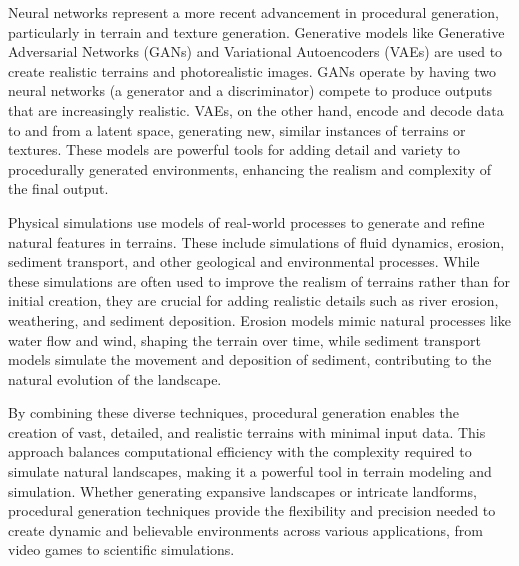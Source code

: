 Neural networks represent a more recent advancement in procedural generation, particularly in terrain and texture generation. Generative models like Generative Adversarial Networks (GANs) and Variational Autoencoders (VAEs) are used to create realistic terrains and photorealistic images. GANs operate by having two neural networks (a generator and a discriminator) compete to produce outputs that are increasingly realistic. VAEs, on the other hand, encode and decode data to and from a latent space, generating new, similar instances of terrains or textures. These models are powerful tools for adding detail and variety to procedurally generated environments, enhancing the realism and complexity of the final output.

Physical simulations use models of real-world processes to generate and refine natural features in terrains. These include simulations of fluid dynamics, erosion, sediment transport, and other geological and environmental processes. While these simulations are often used to improve the realism of terrains rather than for initial creation, they are crucial for adding realistic details such as river erosion, weathering, and sediment deposition. Erosion models mimic natural processes like water flow and wind, shaping the terrain over time, while sediment transport models simulate the movement and deposition of sediment, contributing to the natural evolution of the landscape.

By combining these diverse techniques, procedural generation enables the creation of vast, detailed, and realistic terrains with minimal input data. This approach balances computational efficiency with the complexity required to simulate natural landscapes, making it a powerful tool in terrain modeling and simulation. Whether generating expansive landscapes or intricate landforms, procedural generation techniques provide the flexibility and precision needed to create dynamic and believable environments across various applications, from video games to scientific simulations.


